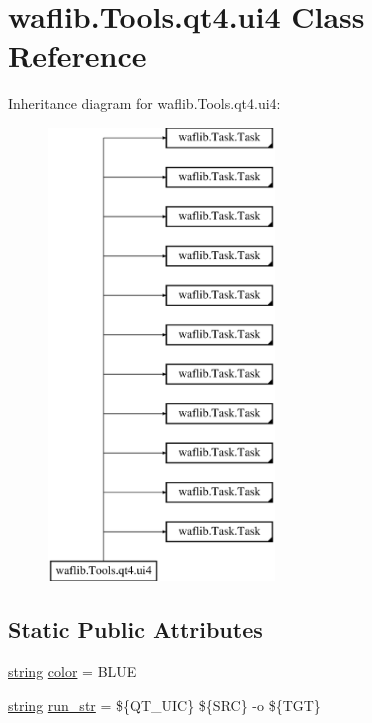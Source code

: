 \hypertarget{classwaflib_1_1_tools_1_1qt4_1_1ui4}{}\section{waflib.\+Tools.\+qt4.\+ui4 Class Reference}
\label{classwaflib_1_1_tools_1_1qt4_1_1ui4}
Inheritance diagram for waflib.\+Tools.\+qt4.\+ui4\+:\begin{figure}[H]
\begin{center}
\leavevmode
\includegraphics[height=12.000000cm]{classwaflib_1_1_tools_1_1qt4_1_1ui4}
\end{center}
\end{figure}
\subsection*{Static Public Attributes}
\begin{DoxyCompactItemize}
\item 
\hyperlink{test__lib_f_l_a_c_2format_8c_ab02026ad0de9fb6c1b4233deb0a00c75}{string} \hyperlink{classwaflib_1_1_tools_1_1qt4_1_1ui4_ad56de643efd5ceb7cba371ed6fe9c861}{color} = \textquotesingle{}B\+L\+UE\textquotesingle{}
\item 
\hyperlink{test__lib_f_l_a_c_2format_8c_ab02026ad0de9fb6c1b4233deb0a00c75}{string} \hyperlink{classwaflib_1_1_tools_1_1qt4_1_1ui4_afe0025efb64a818695607ed467b74970}{run\+\_\+str} = \textquotesingle{}\$\{Q\+T\+\_\+\+U\+IC\} \$\{S\+RC\} -\/o \$\{T\+GT\}\textquotesingle{}
\end{DoxyCompactItemize}
